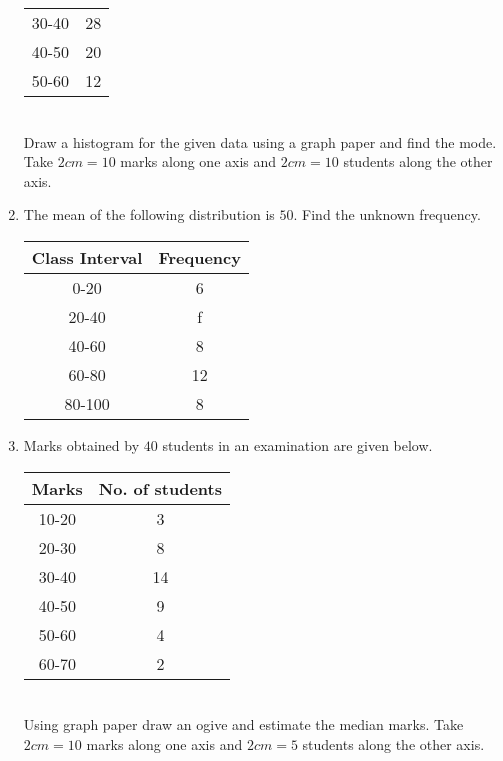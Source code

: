 \begin{enumerate}
\begin{tabular}{|c|c|}
			30-40 & 28 \\
			40-50 & 20 \\
			50-60 & 12 \\
			\hline
		\end{tabular}
		\\Draw a histogram for the given data using a graph paper and find the mode. Take $2 cm = 10$ marks along one axis and $2 cm= 10$ students along the other axis.
	\item The mean of the following distribution is $50$. Find the unknown frequency.
		\centering
		\begin{tabular}{|c|c|}
			\hline
			Class Interval & Frequency \\
			\hline
			0-20 & 6 \\
			20-40 & f \\
			40-60 & 8 \\
			60-80 & 12 \\
			80-100 & 8 \\
			\hline
		\end{tabular}
	\item Marks obtained by $40$ students in an examination are given below.
		\centering
		\begin{tabular}{|c|c|}
			\hline
			Marks & No. of students \\
			\hline
			10-20 & 3 \\
			20-30 & 8 \\
			30-40 & 14 \\
			40-50 & 9 \\
			50-60 & 4 \\
			60-70 & 2 \\
			\hline
		\end{tabular}
		\\Using graph paper draw an ogive and estimate the median marks. Take $2 cm = 10$ marks along one axis and $ 2cm = 5$ students along the other axis.
\end{enumerate}
